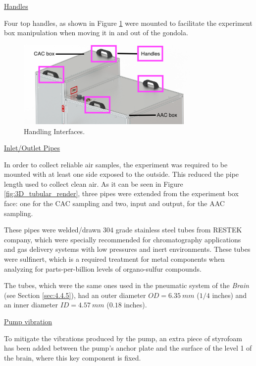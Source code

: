 \bigskip
\underline{Handles}

\smallskip
Four top handles, as shown in Figure \ref{fig:handles} were mounted to facilitate the experiment box manipulation when moving it in and out of the gondola.

\begin{figure}[H]
    \centering
    \includegraphics[width=0.8\textwidth]{4-experiment-design/img/Mechanical/Figure_8.png}
    \caption{Handling Interfaces.}
    \label{fig:handles}
\end{figure}

\bigskip
\underline{Inlet/Outlet Pipes}
\label{subsec:pipes}

\smallskip
In order to collect reliable air samples, the experiment was required to be mounted with at least one side exposed to the outside. This reduced the pipe length used to collect clean air. As it can be seen in Figure \ref{fig:3D_tubular_render}, three pipes were extended from the experiment box face: one for the CAC sampling and two, input and output, for the AAC sampling. 

These pipes were welded/drawn $304$ grade stainless steel tubes from RESTEK company, which were specially recommended for chromatography applications and gas delivery systems with low pressures and inert environments. These tubes were sulfinert, which is a required treatment for metal components when analyzing for parts-per-billion levels of organo-sulfur compounds.

The tubes, which were the same ones used in the pneumatic system of the \emph{Brain} (see Section \ref{sec:4.4.5}), had an outer diameter $OD = 6.35\ mm$ ($1/4$ inches) and an inner diameter $ID = 4.57\ mm$ ($0.18$ inches).

\bigskip
\underline{Pump vibration}
\label{subsec:vibration}

To mitigate the vibrations produced by the pump, an extra piece of styrofoam has been added between the pump's anchor plate and the surface of the level 1 of the brain, where this key component is fixed. 


